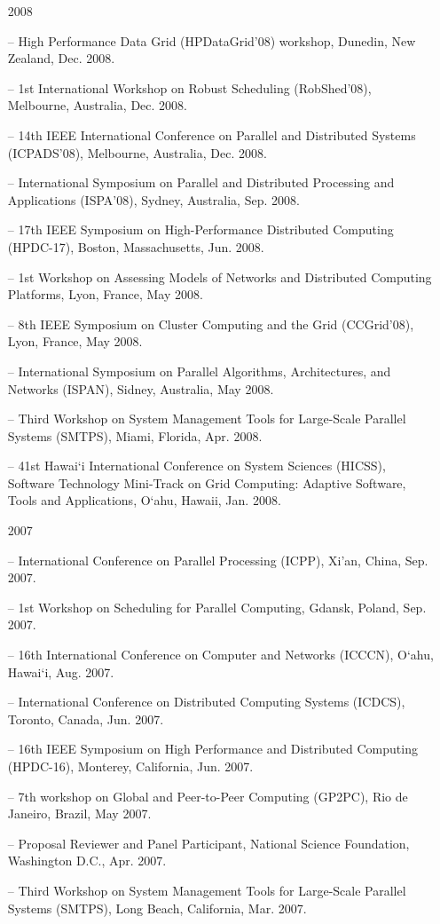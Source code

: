 \documentclass[times,11pt]{letter}
\begin{document}
\begin{itemize}
\item [2008]
\item[--]  High Performance Data Grid (HPDataGrid'08) workshop, Dunedin, New Zealand, Dec. 2008.
\item[--]  1st International Workshop on Robust Scheduling (RobShed'08), Melbourne, Australia, Dec. 2008.
\item[--]  14th IEEE International Conference on Parallel and Distributed Systems (ICPADS'08), Melbourne, Australia, Dec. 2008.
\item[--]  International Symposium on Parallel and Distributed Processing and Applications (ISPA'08), Sydney, Australia, Sep. 2008.
\item[--]  17th IEEE Symposium on High-Performance Distributed Computing (HPDC-17), Boston, Massachusetts, Jun. 2008. 
\item[--]  1st Workshop on Assessing Models of Networks and Distributed Computing Platforms, Lyon, France, May 2008. 
\item[--]  8th IEEE Symposium on Cluster Computing and the Grid (CCGrid'08), Lyon, France, May 2008. 
\item[--]  International Symposium on Parallel Algorithms, Architectures, and Networks (ISPAN), Sidney, Australia, May 2008.
\item[--]  Third Workshop on System Management Tools for Large-Scale Parallel Systems (SMTPS), Miami, Florida, Apr. 2008.
\item[--]  41st Hawai`i International Conference on System Sciences (HICSS), Software Technology Mini-Track on Grid Computing: Adaptive Software, Tools and Applications, O`ahu, Hawaii, Jan. 2008. 

\item [2007]
\item[--]  International Conference on Parallel Processing (ICPP), Xi'an, China, Sep. 2007. 
\item[--]  1st Workshop on Scheduling for Parallel Computing, Gdansk, Poland, Sep. 2007.
\item[--]  16th International Conference on Computer and Networks (ICCCN), O`ahu, Hawai`i, Aug. 2007.
\item[--]  International Conference on Distributed Computing Systems (ICDCS), Toronto, Canada, Jun. 2007.
\item[--]  16th IEEE Symposium on High Performance and Distributed Computing (HPDC-16), Monterey, California, Jun. 2007.
\item[--]  7th workshop on Global and Peer-to-Peer Computing (GP2PC), Rio de Janeiro, Brazil, May 2007. 
\item[--] Proposal Reviewer and Panel Participant, National Science Foundation, Washington D.C., Apr. 2007.
\item[--]  Third Workshop on System Management Tools for Large-Scale Parallel Systems (SMTPS), Long Beach, California, Mar. 2007.


\end{itemize}
\end{document}
